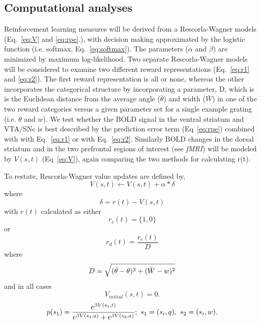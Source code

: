 \documentclass[doc,12pt]{apa}        %
\begin{document}
\subsection{Computational analyses} %
\label{sub:Computational}
Reinforcement learning measures will be derived from a Rescorla-Wagner models (Eq.~\ref{eq:V} and \ref{eq:rpe}.), with decision making approximated by the logistic function (i.e. softmax, Eq.~\ref{eq:softmax}).  The parameters ($\alpha$ and $\beta$) are minimized by maximum log-likelihood.  Two separate Rescorla-Wagner models will be considered to examine two different reward representations (Eq.~\ref{eq:r1} and \ref{eq:r2}).  The first reward representation is all or none, whereas the other incorporates the categorical structure by incorporating a parameter, D, which is is the Euclidean distance from the average angle ($\bar{\theta}$) and width ($\bar{W}$) in one of the two reward categories versus a given parameter set for a single example grating (i.e. $\theta$ and $w$).   We test whether the BOLD signal in the ventral striatum and VTA/SNc is best described by the prediction error term (Eq~\ref{eq:rpe}) combined with with Eq.~\ref{eq:r1} or with Eq.~\ref{eq:r2}.    Similarly BOLD changes in the dorsal striatum and in the two prefrontal regions of interest (see \emph{fMRI}) will be modeled by $V(s,t)$ (Eq~\ref{eq:V}), again comparing the two methods for calculating r(t).

To restate, Rescorla-Wagner value updates are defined by,
\begin{equation} \label{eq:V} V(s,t) \leftarrow V(s,t) + \alpha*\delta \end{equation} where 
\begin{equation} \label{eq:rpe} \delta = r(t) - V(s,t) \end{equation}
with $r(t)$ calculated as either
\begin{equation}
	\label{eq:r1}
	r_{c}(t) = \{1,0\}
\end{equation}
or
\begin{equation}
	\label{eq:r2}
    r_{d}(t) = \frac{r_{c}(t)}{D}
\end{equation}
where
\begin{equation}
	\label{eq:D}\\
	D = \sqrt{(\bar{\theta} - \theta)^2 + (\bar{W}-w)^2}
\end{equation}
and in all cases
\begin{equation} \label{eq:V0} V_{initial}(s,t) = 0. \end{equation}
\begin{equation}
	\label{eq:softmax}
	p(s_1) = {e^{\beta V(s_1,t)}\over{e^{\beta V(s_1,a)} + e^{\beta V(s_2,a)}}};\ s_1 = (s_{i},q), \ s_2 = (s_{i}, w).
\end{equation}
\end{document}
